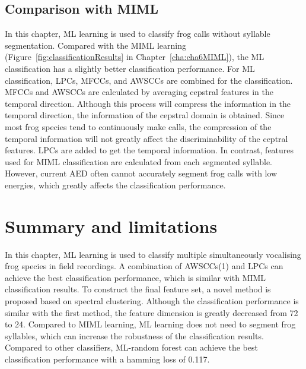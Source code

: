 \begin{table}[htb!]
\centering
\caption{Comparison of different ML classifiers}
\label{tab:MLclassifierComparision}
\end{table}




\subsection{Comparison with MIML}
In this chapter, ML learning is used to classify frog calls without syllable segmentation. Compared with the MIML learning (Figure~\ref{fig:classificationResults} in Chapter~\ref{cha:cha6MIML}), the ML classification has a slightly better classification performance. For ML classification, LPCs, MFCCs, and AWSCCs are combined for the classification. MFCCs and AWSCCs are calculated by averaging cepstral features in the temporal direction. Although this process will compress the information in the temporal direction, the information of the cepstral domain is obtained. Since most frog species tend to continuously make calls, the compression of the temporal information will not greatly affect the discriminability of the ceptral features.
LPCs are added to get the temporal information. In contrast, features used for MIML classification are calculated from each segmented syllable. However, current AED often cannot accurately segment frog calls with low energies, which greatly affects the classification performance.


\section{Summary and limitations}
In this chapter, ML learning is used to classify multiple simultaneously vocalising frog species in field recordings. A combination of AWSCCs(1) and LPCs can achieve the best classification performance, which is similar with MIML classification results. To construct the final feature set, a novel method is proposed based on spectral clustering. Although the classification performance is similar with the first method, the feature dimension is greatly decreased from 72 to 24. Compared to MIML learning, ML learning does not need to segment frog syllables, which can increase the robustness of the classification results. Compared to other classifiers, ML-random forest can achieve the best classification performance with a hamming loss of 0.117. 






